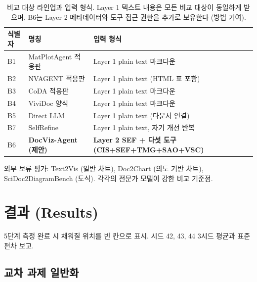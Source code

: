 \documentclass[11pt]{article}
\begin{document}
\begin{table}[h]
\centering
\small
\begin{tabular}{lll}
\toprule
식별자 & 명칭 & 입력 형식 \\
\midrule
B1 & MatPlotAgent 적응판 & Layer 1 plain text 마크다운 \\
B2 & NVAGENT 적응판 & Layer 1 plain text (HTML 표 포함) \\
B3 & CoDA 적응판 & Layer 1 plain text 마크다운 \\
B4 & ViviDoc 양식 & Layer 1 plain text 마크다운 \\
B5 & Direct LLM & Layer 1 plain text (다문서 연결) \\
B7 & SelfRefine & Layer 1 plain text, 자기 개선 반복 \\
B6 & \textbf{DocViz-Agent (제안)} & \textbf{Layer 2 SEF + 다섯 도구 (CIS+SEF+TMG+SAO+VSC)} \\
\bottomrule
\end{tabular}
\caption{비교 대상 라인업과 입력 형식. Layer 1 텍스트 내용은 모든 비교 대상이 동일하게 받으며, B6는 Layer 2 메타데이터와 도구 접근 권한을 추가로 보유한다 (방법 기여).}
\label{tab:baselines}
\end{table}

외부 보류 평가: Text2Vis (일반 차트), Doc2Chart (의도 기반 차트), SciDoc2DiagramBench (도식). 각각의 전문가 모델이 강한 비교 기준점.

\section{결과 (Results)}

5단계 측정 완료 시 채워질 위치를 빈 칸으로 표시. 시드 42, 43, 44 3시드 평균과 표준편차 보고.

\subsection{교차 과제 일반화}
\end{document}
